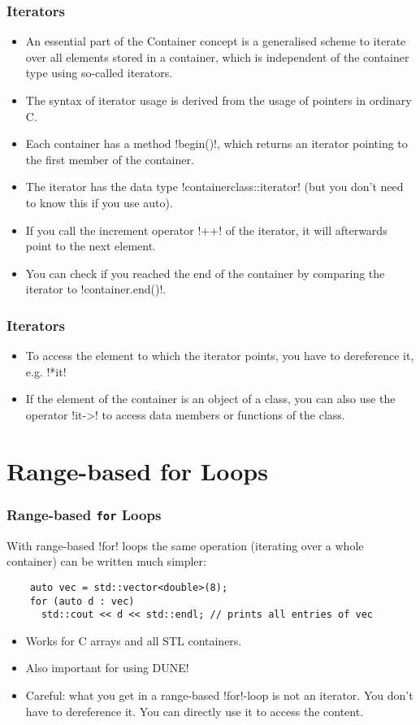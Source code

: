 \begin{frame}
\frametitle{Iterators}
\begin{itemize}
\item An essential part of the Container concept is a generalised scheme to iterate over all elements stored in a container, which is independent of the container type using so-called iterators.
\item The syntax of iterator usage is derived from the usage of pointers in ordinary C.
\item Each container has a method \inline!begin()!, which returns an iterator pointing to the first member of the container.
\item The iterator has the data type \inline!containerclass::iterator! (but you don't need to know this if you use auto).
\item If you call the increment operator \inline!++! of the iterator, it will afterwards point to the next element.
\item You can check if you reached the end of the container by comparing the iterator to \inline!container.end()!.
\end{itemize}
\end{frame}

\begin{frame}
\frametitle<presentation>{Iterators}
\begin{itemize}
\item To access the element to which the iterator points, you have to dereference it, e.g. \inline!*it!
\item If the element of the container is an object of a class, you can also use the operator \inline!it->! to access data members or functions of the class.
\end{itemize}

\end{frame}

\section{Range-based for Loops}

\begin{frame}[fragile]
  \frametitle<presentation>{Range-based \texttt{for} Loops}
  With range-based \inline!for! loops the same operation (iterating over a whole container) can be written much simpler:
  \begin{lstlisting}
    auto vec = std::vector<double>(8);
    for (auto d : vec)
      std::cout << d << std::endl; // prints all entries of vec
  \end{lstlisting}
  \begin{itemize}
  \item Works for C arrays and all STL containers.
  \item Also important for using DUNE!
  \item Careful: what you get in a range-based \inline!for!-loop is not an iterator. You don't have to dereference it. You can directly use it to access the content.
  \end{itemize}
\end{frame}

